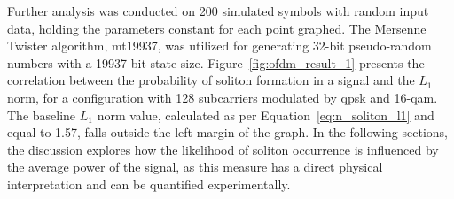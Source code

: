 Further analysis was conducted on 200 simulated symbols with random input data, holding the parameters constant for each point graphed. The Mersenne Twister algorithm, mt19937, was utilized for generating 32-bit pseudo-random numbers with a 19937-bit state size. Figure~\ref{fig:ofdm_result_1} presents the correlation between the probability of soliton formation in a signal and the \( L_1 \) norm, for a configuration with 128 subcarriers modulated by \acrshort{qpsk} and 16-\acrshort{qam}. The baseline \( L_1 \) norm value, calculated as per Equation~\ref{eq:n_soliton_l1} and equal to 1.57, falls outside the left margin of the graph. In the following sections, the discussion explores how the likelihood of soliton occurrence is influenced by the average power of the signal, as this measure has a direct physical interpretation and can be quantified experimentally.



